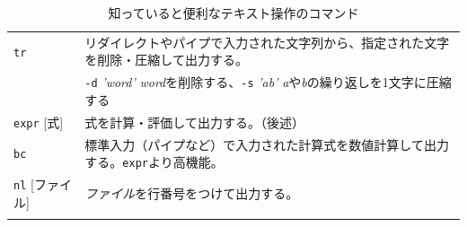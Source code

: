 \documentclass[a4j]{ltjsreport}
\begin{document}
\begin{longtable}[c]{|p{3.5cm}|p{13.5cm}|}
        \hline
        \texttt{tr} &リダイレクトやパイプで入力された文字列から、指定された文字を削除・圧縮して出力する。\\
        &\texttt{-d} \textit{'word'} \textit{word}を削除する、\texttt{-s} \textit{'ab'} \textit{a}や\textit{b}の繰り返しを1文字に圧縮する\\
        \hline
        \texttt{expr} [式]&式を計算・評価して出力する。（後述）\\ 
        \hline
        \texttt{bc} &標準入力（パイプなど）で入力された計算式を数値計算して出力する。\texttt{expr}より高機能。\\ 
        \hline
        \texttt{nl} [ファイル]&\emph{ファイル}を行番号をつけて出力する。\\
        \hline

        \caption{知っていると便利なテキスト操作のコマンド}
    \end{longtable}
\end{document}
